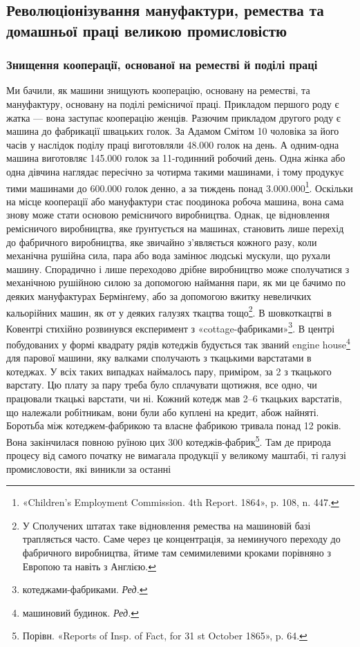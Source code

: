 
\subsection{Революціонізування мануфактури, ремества та домашньої
праці великою промисловістю}

\subsubsection{Знищення кооперації, основаної
на реместві й поділі праці}

Ми бачили, як машини знищують кооперацію, основану на
реместві, та мануфактуру, основану на поділі ремісничої
праці. Прикладом першого роду є жатка — вона заступає кооперацію
женців. Разючим прикладом другого роду є машина до
фабрикації швацьких голок. За Адамом Смітом 10 чоловіка за
його часів у наслідок поділу праці виготовляли \num{48.000} голок на
день. А одним-одна машина виготовляє \num{145.000} голок за 11-годинний
робочий день. Одна жінка або одна дівчина наглядає
пересічно за чотирма такими машинами, і тому продукує тими
машинами до \num{600.000} голок денно, а за тиждень понад \num{3.000.000}\footnote{
«Children’s Employment Commission. 4th Report. 1864», p. 108,
n. 447.
}.
Оскільки на місце кооперації або мануфактури стає поодинока
робоча машина, вона сама знову може стати основою ремісничого
виробництва. Однак, це відновлення ремісничого виробництва,
яке ґрунтується на машинах, становить лише перехід до фабричного
виробництва, яке звичайно з’являється кожного разу, коли
механічна рушійна сила, пара або вода замінює людські мускули,
що рухали машину. Спорадично і лише переходово дрібне виробництво
може сполучатися з механічною рушійною силою за
допомогою наймання пари, як ми це бачимо по деяких мануфактурах
Бермінґему, або за допомогою вжитку невеличких кальорійних
машин, як от у деяких галузях ткацтва тощо\footnote{
У Сполучених штатах таке відновлення ремества на машиновій
базі трапляється часто. Саме через це концентрація, за неминучого переходу
до фабричного виробництва, йтиме там семимилевими кроками порівняно
з Европою та навіть з Англією.
}. В шовкоткацтві в Ковентрі стихійно розвинувся експеримент з
«cottage-фабриками»\footnote*{
котеджами-фабриками. \emph{Ред.}
}.
В центрі побудованих у формі квадрату рядів котеджів
будується так званий engine house\footnote*{
машиновий будинок. \emph{Ред.}
} для парової машини, яку валками сполучають з ткацькими варстатами в котеджах.
У всіх таких випадках наймалось пару, приміром, за 2
з ткацького варстату. Цю плату за пару треба було сплачувати
щотижня, все одно, чи працювали ткацькі варстати, чи ні. Кожний
котедж мав 2--6 ткацьких варстатів, що належали робітникам,
вони були або куплені на кредит, абож найняті. Боротьба між
котеджем-фабрикою та власне фабрикою тривала понад 12 років.
Вона закінчилася повною руїною цих 300 котеджів-фабрик\footnote{
Порівн. «Reports of Insp. of Fact, for 31 st October 1865», p. 64.
}. Там де природа процесу від самого початку не вимагала продукції у великому
маштабі, ті галузі промисловости, які виникли за останні
\parbreak{}  %
